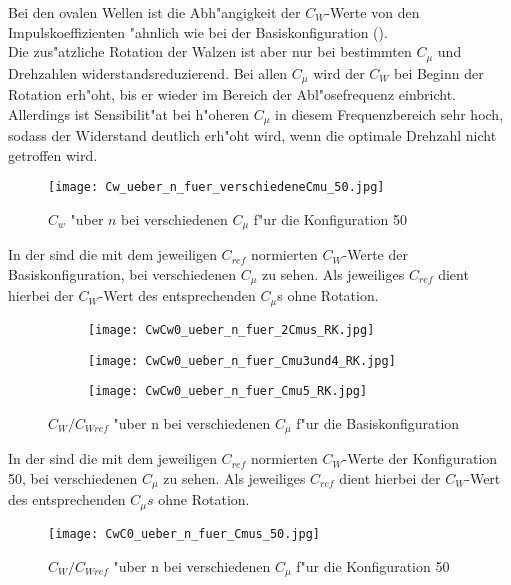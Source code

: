 Bei den ovalen Wellen ist die Abh"angigkeit der $C_{W}$-Werte von den Impulskoeffizienten "ahnlich wie bei der Basiskonfiguration ().\\
Die zus"atzliche Rotation der Walzen ist aber nur bei bestimmten $C_{\mu}$ und Drehzahlen widerstandsreduzierend. Bei allen $C_{\mu}$ wird der $C_{W}$ bei Beginn der Rotation erh"oht, bis er wieder im Bereich der Abl"osefrequenz einbricht. Allerdings ist Sensibilit"at bei h"oheren $C_{\mu}$ in diesem Frequenzbereich sehr hoch, sodass der Widerstand deutlich erh"oht wird, wenn die optimale Drehzahl nicht getroffen wird.

\begin{figure}[h]
	\centering
	\texttt{[image: Cw\_ueber\_n\_fuer\_verschiedeneCmu\_50.jpg]}
	\caption{$C_{w}$ "uber $n$ bei verschiedenen $C_{\mu}$ f"ur die Konfiguration 50}
	\label{fig:Cw/n bei Cmu 50}
\end{figure}

In der  sind die mit dem jeweiligen $C_{ref}$ normierten $C_{W}$-Werte der Basiskonfiguration, bei verschiedenen $C_{\mu}$ zu sehen.
Als jeweiliges $C_{ref}$ dient hierbei der $C_{W}$-Wert des entsprechenden $C_{\mu}$s ohne Rotation.


\begin{figure}[h]
	\centering
	\begin{subfigure}[c]{0.45\textwidth}		
		\texttt{[image: CwCw0\_ueber\_n\_fuer\_2Cmus\_RK.jpg]}
	\end{subfigure}
	\begin{subfigure}[c]{0.45\textwidth}
		\texttt{[image: CwCw0\_ueber\_n\_fuer\_Cmu3und4\_RK.jpg]}
	\end{subfigure}
	\begin{subfigure}[c]{0.45\textwidth}
		\texttt{[image: CwCw0\_ueber\_n\_fuer\_Cmu5\_RK.jpg]}
	\end{subfigure}
	\caption{$C_{W}/C_{Wref}$ "uber n bei verschiedenen $C_{\mu}$ f"ur die Basiskonfiguration}
	\label{fig:CwCwref/n Cmu RK}
\end{figure}

In der  sind die mit dem jeweiligen $C_{ref}$ normierten $C_{W}$-Werte der Konfiguration 50, bei verschiedenen $C_{\mu}$ zu sehen.
Als jeweiliges $C_{ref}$ dient hierbei der $C_{W}$-Wert des entsprechenden $C_{\mu}s$ ohne Rotation.

\begin{figure}[h]
	\centering
	\texttt{[image: CwC0\_ueber\_n\_fuer\_Cmus\_50.jpg]}
	\caption{$C_{W}/C_{Wref}$ "uber n bei verschiedenen $C_{\mu}$ f"ur die Konfiguration 50}
	\label{fig:CwCwref/n Cmu 50}
\end{figure}

